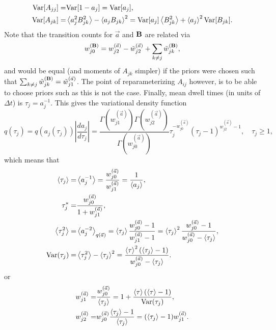 \begin{align}
\text{Var}[A_{jj}]=&\text{Var}[1-a_j]=\text{Var}[a_j],\nonumber\\
\text{Var}[A_{jk}]=&\left\langle a_j^2B_{jk}^2\right\rangle-\left\langle a_jB_{jk}\right\rangle^2
        =\text{Var}[a_j]\left\langle B_{jk}^2\right\rangle+\left\langle a_j\right\rangle^2\text{Var}[B_{jk}].\label{Avar}
\end{align}
Note that the transition counts
for $\vec a$ and $\mathbf{B}$ are related via
\begin{equation}
w_{j0}^{(\mathbf{B})}=w_{j2}^{(\vec{a})}-\tilde w_{j2}^{(\vec{a})}+\sum_{k\ne j}\tilde w_{jk}^{(\mathbf{B})},
\end{equation}
and would be equal (and moments of $A_{jk}$ simpler) if the priors
were chosen such that $\sum_{k\ne j}\tilde
w_{jk}^{(\mathbf{B})}=\tilde w_{j1}^{(\vec{a})}$. The point of
reparameterizing $A_{ij}$ however, is to be able to choose priors such
as this is not the case. Finally, mean dwell times (in units of
$\Delta t$) is $\tau_j=a_j^{-1}$. This gives the variational density
function
\begin{equation}
q(\tau_j)=q(a_j(\tau_j))\left|\frac{da_j}{d\tau_j}\right|
=\frac{\Gamma(w_{j1}^{(\vec{a})})\Gamma(w_{j2}^{(\vec{a})})}{\Gamma(w_{j0}^{(\vec{a})})}
\tau_j^{-w_{j0}^{(\vec{a})}}(\tau_j-1)^{w_{j2}^{(\vec{a})}-1},
\quad \tau_j\ge 1,
\end{equation}
which means that
\begin{align}
\left\langle \tau_j\right\rangle=&\left\langle a_j^{-1}\right\rangle=
\frac{w_{j0}^{(\vec{a})}}{w_{j1}^{(\vec{a})}}=\frac{1}{\left\langle a_j\right\rangle},\\
\tau_j^*=&\frac{w_{j0}^{(\vec{a})}}{1+w_{j1}^{(\vec{a})}},\\
\left\langle \tau_j^2\right\rangle=&\left\langle a_j^{-2}\right\rangle_{q(\vec{a})}=
\left\langle \tau_j\right\rangle\frac{w_{j0}^{(\vec{a})}-1}{w_{j1}^{(\vec{a})}-1}
=\left\langle \tau_j\right\rangle^2\frac{w_{j0}^{(\vec{a})}-1}{w_{j0}^{(\vec{a})}-\left\langle \tau_j\right\rangle},\\
\text{Var}(\tau_j)=&
\left\langle \tau_j^2\right\rangle-\left\langle \tau_j\right\rangle^2=
\frac{\left\langle \tau\right\rangle^2(\left\langle \tau_j\right\rangle-1)}{w_{j0}^{(\vec{a})}-\left\langle \tau_j\right\rangle}.
\end{align}
or
\begin{align}
w_{j1}^{(\vec{a})}=&\frac{w_{j0}^{(\vec{a})}}{\left\langle \tau_j\right\rangle}
=1+\frac{\left\langle \tau\right\rangle(\left\langle \tau\right\rangle-1)}{\text{Var}(\tau_j)},\nonumber\\
w_{j2}^{(\vec{a})}=&w_{j0}^{(\vec{a})}\frac{\left\langle \tau_j\right\rangle-1}{\left\langle \tau_j\right\rangle}
=(\left\langle \tau_j\right\rangle-1)w_{j1}^{(\vec{a})}.\label{eq:wjka}
\end{align}




